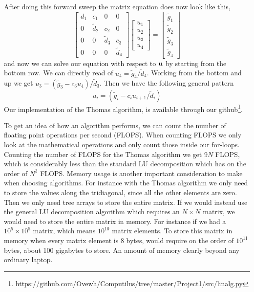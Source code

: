 After doing this forward sweep the matrix equation does now look like this,
\begin{equation*}
  \begin{bmatrix}
    d_1 & c_1 & 0 & 0 \\
    0 & \tilde{d}_2 & c_2 & 0 \\
    0 & 0 & \tilde{d}_3 & c_3  \\
    0 & 0 & 0 & \tilde{d}_4
  \end{bmatrix} \begin{bmatrix}
    u_1 \\ u_2 \\ u_3 \\ u_4
  \end{bmatrix} = \begin{bmatrix}
    \tilde{g}_1 \\ \tilde{g}_2 \\ \tilde{g}_3 \\ \tilde{g}_4
  \end{bmatrix}
\end{equation*}
and now we can solve our equation with respect to $\mathbf{u}$ by starting from
the bottom row. We can directly read of $u_4 = \tilde{g}_4 / \tilde{d}_4$.
Working from the bottom and up we get $u_3 = \left(\tilde{g}_3-c_3
u_4\right)/\tilde{d}_3$. Then we have the following general pattern
\begin{equation}
  u_i = \left(\tilde{g}_i - c_i u_{i+1}/\tilde{d}_i \right)
\end{equation}
Our implementation of the Thomas algorithm, is available
through our github\footnote{https://github.com/Ovewh/Computilus/tree/master/Project1/src/linalg.py}.


To get an idea of how an algorithm performs, we can count
the number of floating point operations per second (FLOPS). When counting FLOPS
we only look at the mathematical operations and only count those inside our
for-loops. Counting the number of FLOPS for the Thomas algorithm we get $9N$
FLOPS, which is considerably less than the standard LU decomposition which has
on the order of $N^3$ FLOPS.
Memory usage is another important consideration to make when choosing
algorithms. For instance with the Thomas algorithm we only need to store the
values along the tridiagonal, since all the other elements are zero. Then we only need tree arrays to store the entire matrix. If we
would instead use the general LU decomposition algorithm which requires an $N
\times N$ matrix, we would need to store the entire matrix in memory. For
instance if we had a $10^5 \times 10^5$ matrix, which means $10^10$ matrix
elements. To store this matrix in memory when
every matrix element is 8 bytes, would require on the order of $10^{11}$
bytes, about 100 gigabytes to store. An amount of memory clearly beyond any
ordinary laptop.

